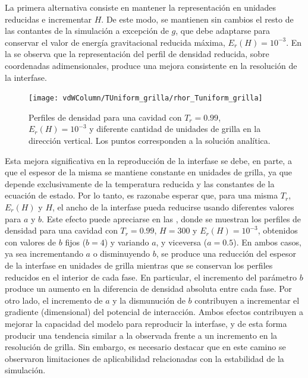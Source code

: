 La primera alternativa consiste en mantener la representaci\'on en unidades reducidas e incrementar $H$. De este modo, se mantienen sin cambios el resto de las contantes de la simulaci\'on a excepci\'on de $g$, que debe adaptarse para conservar el valor de energ\'ia gravitacional reducida m\'axima, $E_r(H) = 10^{-3}$. En la  se observa que la representaci\'on del perfil de densidad reducida, sobre coordenadas adimensionales, produce una mejora consistente en la resoluci\'on de la interfase.

\begin{figure}[ht]
	\centering
	\texttt{[image: vdWColumn/TUniform\_grilla/rhor\_Tuniform\_grilla]}
	\caption{Perfiles de densidad para una cavidad con $T_r = 0.99$, $E_r(H) = 10^{-3}$ y diferente cantidad de unidades de grilla en la direcci\'on vertical. Los puntos corresponden a la soluci\'on anal\'itica.}
	\label{fig:vdWColumn_rhor_grilla}
\end{figure}

Esta mejora significativa en la reproducci\'on de la interfase se debe, en parte, a que el espesor de la misma se mantiene constante en unidades de grilla, ya que depende exclusivamente de la temperatura reducida y las constantes de la ecuaci\'on de estado. Por lo tanto, es razonabe esperar que, para una misma $T_r$, $E_r(H)$ y $H$, el ancho de la interfase pueda reducirse usando diferentes valores para $a$ y $b$. Este efecto puede apreciarse en las , donde se muestran los perfiles de densidad para una cavidad con $T_r=0.99$, $H=300$ y $E_r(H)=10^{-3}$, obtenidos con valores de $b$ fijos ($b=4$) y variando $a$, y viceversa ($a=0.5$). En ambos casos, ya sea incrementando $a$ o disminuyendo $b$, se produce una reducci\'on del espesor de la interfase en unidades de grilla mientras que se conservan los perfiles reducidos en el interior de cada fase. En particular, el incremento del par\'ametro $b$ produce un aumento en la diferencia de densidad absoluta entre cada fase. Por otro lado, el incremento de $a$ y la dismunuci\'on de $b$ contribuyen a incrementar el gradiente (dimensional) del potencial de interacci\'on. Ambos efectos contribuyen a mejorar la capacidad del modelo \pp{} para reproducir la interfase, y de esta forma producir una tendencia similar a la observada frente a un incremento en la resoluci\'on de grilla. Sin embargo, es necesario destacar que en este camino se observaron limitaciones de aplicabilidad relacionadas con la estabilidad de la simulaci\'on.

